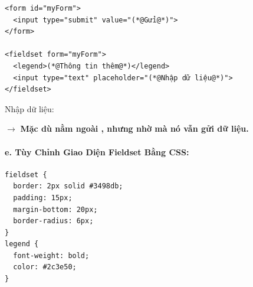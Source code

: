 \vspace{6pt}

\begin{codeWindow}
\begin{lstlisting}[language=HTML5]
<form id="myForm">
  <input type="submit" value="(*@Gửi@*)">
</form>

<fieldset form="myForm">
  <legend>(*@Thông tin thêm@*)</legend>
  <input type="text" placeholder="(*@Nhập dữ liệu@*)">
</fieldset>
\end{lstlisting}
\end{codeWindow}

\begin{browserWindow}
\sffamily\small
{} \par\vspace{10pt}
\begin{tcolorbox}[
    enhanced, colback=white, colframe=gray!60, boxrule=0.6pt, arc=0pt,
    top=10pt, bottom=10pt, left=10pt, right=10pt,
    coltitle=darkText,
    title={\sffamily\small\textcolor{darkText}{Thông tin thêm}},
    attach boxed title to top left={xshift=10pt, yshift=-6pt},
    boxed title style={colback=white, colframe=white, boxrule=0pt, left=3pt, right=3pt, top=0pt, bottom=0pt}
]
Nhập dữ liệu: \quad {}
\end{tcolorbox}
\end{browserWindow}
\textcolor{primaryBlue}{\textbf{$\rightarrow$}} \textbf{Mặc dù  nằm ngoài , nhưng nhờ  mà nó vẫn gửi dữ liệu.}

\paragraph{e. Tùy Chỉnh Giao Diện Fieldset Bằng CSS:}
\begin{codeWindow}
\begin{lstlisting}[language=CSS3]
fieldset {
  border: 2px solid #3498db;
  padding: 15px;
  margin-bottom: 20px;
  border-radius: 6px;
}
legend {
  font-weight: bold;
  color: #2c3e50;
}
\end{lstlisting}
\end{codeWindow}

